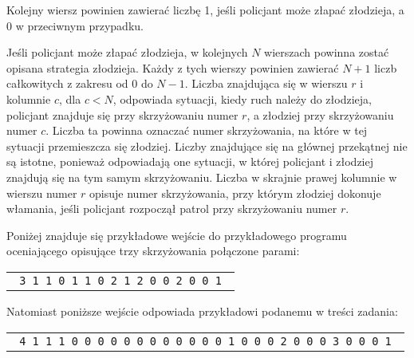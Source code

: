\documentclass{boi2014-pl}
\begin{document}
    Kolejny wiersz powinien zawierać liczbę 1, jeśli policjant może złapać złodzieja,
    a 0 w przeciwnym przypadku.

    Jeśli policjant może złapać złodzieja, w kolejnych $N$ wierszach powinna zostać
    opisana strategia złodzieja.
    Każdy z tych wierszy powinien zawierać 
    $N+1$ liczb całkowitych z zakresu od 0 do $N-1$.
    Liczba znajdująca się w wierszu $r$ i kolumnie $c$, dla $c < N$,
    odpowiada sytuacji, kiedy ruch należy do złodzieja, policjant
    znajduje się przy skrzyżowaniu numer $r$, a złodziej przy skrzyżowaniu numer $c$.
    Liczba ta powinna oznaczać numer skrzyżowania, na które w tej sytuacji
    przemieszcza się złodziej.
    Liczby znajdujące się na głównej przekątnej nie są istotne, ponieważ odpowiadają one
    sytuacji, w której policjant i złodziej znajdują się na tym samym skrzyżowaniu.
    Liczba w skrajnie prawej kolumnie w wierszu numer $r$ opisuje numer skrzyżowania, przy którym
    złodziej dokonuje włamania, jeśli policjant rozpoczął patrol przy skrzyżowaniu numer $r$.

    Poniżej znajduje się przykładowe wejście do przykładowego programu oceniającego
    opisujące trzy skrzyżowania połączone parami:

    \begin{center}
        \begin{tabular}{p{4cm}}
            {\tt
                3 \newline
                0 1 1 \newline
                1 0 1 \newline
                1 1 0 \newline
                1 \newline
                0 2 1 2 \newline
                2 0 0 2 \newline
                1 0 0 1 \newline
            }
        \end{tabular}
    \end{center}

    Natomiast poniższe wejście odpowiada przykładowi podanemu w treści zadania:

    \begin{center}
        \begin{tabular}{p{4cm}}
            {\tt
                4 \newline
                0 1 1 1 \newline
                1 0 0 0 \newline
                1 0 0 0 \newline
                1 0 0 0 \newline
                1 \newline
                0 0 0 0 1 \newline
                2 0 0 0 2 \newline
                3 0 0 0 3 \newline
                1 0 0 0 1 \newline
            }
        \end{tabular}
    \end{center}
\end{document}
